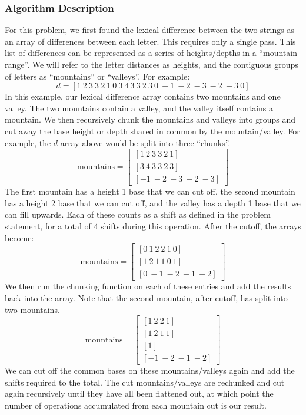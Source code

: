 \documentclass[letterpaper, 12pt]{math}
\begin{document}
\subsubsection*{Algorithm Description}
For this problem, we first found the lexical difference between the two strings
as an array of differences between each letter. This requires only a single
pass. This list of differences can be represented as a series of
heights/depths in a ``mountain range''. We will refer to the letter distances
as heights, and the contiguous groups of letters as ``mountains'' or
``valleys''. For example:
\[ d = [1\ 2\ 3\ 3\ 2\ 1\ 0\ 3\ 4\ 3\ 3\ 2\ 3\ 0\ -1\ -2\ -3\ -2\ -3\ 0] \]
In this example, our lexical difference array contains two mountains and one
valley. The two mountains contain a valley, and the valley itself contains a
mountain. We then recursively chunk the mountains and valleys into groups and
cut away the base height or depth shared in common by the mountain/valley.
For example, the \( d \) array above would be split into three ``chunks''.
\[ \text{mountains} = \begin{bmatrix}
  [1\ 2\ 3\ 3\ 2\ 1] \\
  [3\ 4\ 3\ 3\ 2\ 3] \\
  [-1\ -2\ -3\ -2\ -3]
\end{bmatrix} \]
The first mountain has a height 1 base that we can cut off, the second mountain
has a height 2 base that we can cut off, and the valley has a depth 1 base that
we can fill upwards. Each of these counts as a shift as defined in the problem
statement, for a total of 4 shifts during this operation. After the cutoff,
the arrays become:
\[ \text{mountains} = \begin{bmatrix}
  [0\ 1\ 2\ 2\ 1\ 0] \\
  [1\ 2\ 1\ 1\ 0\ 1] \\
  [0\ -1\ -2\ -1\ -2]
\end{bmatrix} \]
We then run the chunking function on each of these entries and add the results
back into the array. Note that the second mountain, after cutoff, has split into
two mountains.
\[ \text{mountains} = \begin{bmatrix}
  [1\ 2\ 2\ 1] \\
  [1\ 2\ 1\ 1] \\
  [1] \\
  [-1\ -2\ -1\ -2]
\end{bmatrix} \]
We can cut off the common bases on these mountains/valleys again and add the
shifts required to the total. The cut mountains/valleys are rechunked and cut
again recursively until they have all been flattened out, at which point the
number of operations accumulated from each mountain cut is our result.
\end{document}

